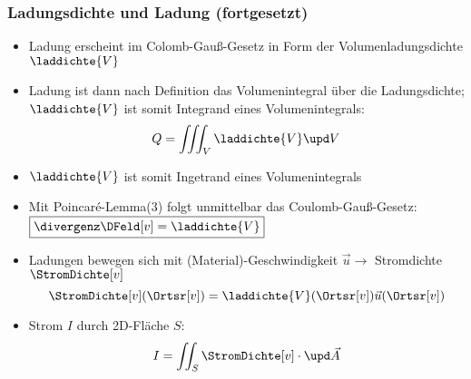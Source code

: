\begin{frame}
  \frametitle{Ladungsdichte und Ladung (fortgesetzt)}
\begin{itemize}[<+->]
\item<1-> Ladung erscheint im Colomb-Gauß-Gesetz in Form der Volumenladungsdichte \(\laddichte{V} \)
\item<1-> Ladung ist dann nach Definition das Volumenintegral über die Ladungsdichte; \(\laddichte{V} \) ist somit Integrand eines Volumenintegrals:
  \begin{equation*}
    Q = \iiint_V \laddichte{V} \upd V
  \end{equation*}
\item \(\laddichte{V} \) ist somit Ingetrand eines Volumenintegrals
  \item Mit Poincaré-Lemma(3) folgt unmittelbar das Coulomb-Gauß-Gesetz: \( \boxed{\divergenz\DFeld[v] = \laddichte{V} }\)
  \item Ladungen bewegen sich mit (Material)-Geschwindigkeit \(\vec{u} \to\) Stromdichte \(\StromDichte[v]\)
    \begin{equation*}
\StromDichte[v](\Ortsr[v]) = \laddichte{V}(\Ortsr[v])\vec{u}(\Ortsr[v])
\end{equation*}
\item Strom \(I\) durch 2D-Fläche \(S\):
  \begin{equation*}
    I = \iint_S \StromDichte[v] \cdot \upd\vec{A}
    \end{equation*}
\end{itemize}
\end{frame}



